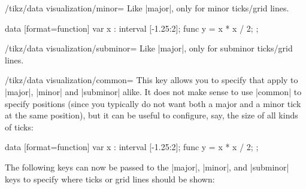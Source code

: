 \begin{key}{/tikz/data visualization/minor=}
    Like |major|, only for minor ticks/grid lines.
\begin{codeexample}[preamble={\usetikzlibrary{datavisualization.formats.functions}}]
\tikz \datavisualization
  [ school book axes, visualize as smooth line,
    x axis={grid={minor={at={1, 1.5, 2}}}}]
  data [format=function] {
    var x : interval [-1.25:2];
    func y = \value x * \value x / 2;
  };
\end{codeexample}
\end{key}

\begin{key}{/tikz/data visualization/subminor=}
    Like |major|, only for subminor ticks/grid lines.
\end{key}

\begin{key}{/tikz/data visualization/common=}
    This key allows you to specify  that apply to |major|,
    |minor| and |subminor| alike. It does not make sense to use |common| to
    specify positions (since you typically do not want both a major and a minor
    tick at the same position), but it can be useful to configure, say, the
    size of all kinds of ticks:
\begin{codeexample}[preamble={\usetikzlibrary{datavisualization.formats.functions}}]
\tikz \datavisualization
  [ school book axes, visualize as smooth line,
    x axis={ticks={minor steps between steps, common={low=0}}} ]
  data [format=function] {
    var x : interval [-1.25:2];
    func y = \value x * \value x / 2;
  };
\end{codeexample}
\end{key}

The following keys can now be passed to the |major|, |minor|, and |subminor|
keys to specify where ticks or grid lines should be shown:

